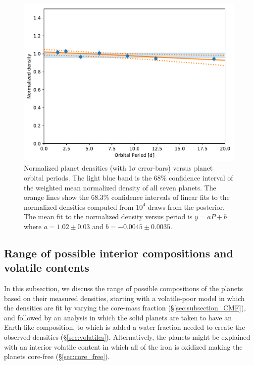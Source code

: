 \documentclass[twocolumn]{aastex63}
\begin{document}
\begin{figure}
    \centering
    \includegraphics[width=\hsize]{figures/Norm_dens_vs_period.pdf}
    \caption{Normalized planet densities (with 1$\sigma$ error-bars) versus planet orbital periods. The light blue band is the 68\% confidence interval of the weighted mean normalized density of all seven planets.  The orange lines show the 68.3\% confidence intervals of linear fits to the normalized densities computed from $10^4$
     draws from the posterior.  The mean fit to the normalized density versus period is $y = a P + b$ where $a= 1.02\pm 0.03$ and $b=-0.0045\pm0.0035$.}
    \label{fig:norm_density_vs_period}
\end{figure}


\subsection{Range of possible interior compositions and volatile contents}  \label{sec:interior_compositions}

In this subsection, we discuss the range of possible compositions of the planets based on their measured densities,
starting with a volatile-poor model in which the densities are fit by varying the core-mass fraction (\S \ref{sec:subsection_CMF}),
and followed by an analysis in which the solid planets are taken to have an Earth-like composition, to which is added a water fraction needed to create the observed densities (\S \ref{sec:volatiles}). %
Alternatively, the planets might be explained with an interior volatile content in which all of the iron is oxidized making the planets core-free (\S \ref{sec:core_free}).
\end{document}
